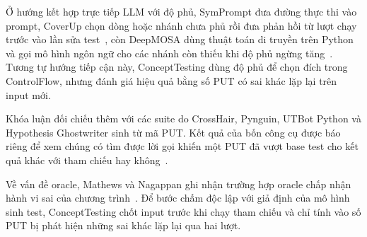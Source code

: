 Ở hướng kết hợp trực tiếp LLM với độ phủ, SymPrompt đưa đường thực thi vào prompt, CoverUp chọn dòng hoặc nhánh chưa phủ rồi đưa phản hồi từ lượt chạy trước vào lần sửa test~\cite{ryan2024symprompt,pizzorno2025coverup}, còn DeepMOSA dùng thuật toán di truyền trên Python và gọi mô hình ngôn ngữ cho các nhánh còn thiếu khi độ phủ ngừng tăng~\cite{dao2026deepmosa}. Tương tự hướng tiếp cận này, ConceptTesting dùng độ phủ để chọn đích trong ControlFlow, nhưng đánh giá hiệu quả bằng số PUT có sai khác lặp lại trên input mới.

Khóa luận đối chiếu thêm với các suite do CrossHair, Pynguin, UTBot Python và Hypothesis Ghostwriter sinh từ mã PUT. Kết quả của bốn công cụ được báo riêng để xem chúng có tìm được lời gọi khiến một PUT đã vượt base test cho kết quả khác với tham chiếu hay không~\cite{crosshairDocs,pynguinDocs,utbotPythonDocs,hypothesisIntroDocs}.

Về vấn đề oracle, Mathews và Nagappan ghi nhận trường hợp oracle chấp nhận hành vi sai của chương trình~\cite{mathews2024design}. Để bước chấm độc lập với giả định của mô hình sinh test, ConceptTesting chốt input trước khi chạy tham chiếu và chỉ tính vào số PUT bị phát hiện những sai khác lặp lại qua hai lượt.
